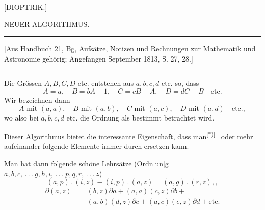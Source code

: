 \clearpage\begingroup
\NoSourceHead{}
\makeatletter\tagsleft@true\let\veqno\@@leqno\makeatother
\begin{center}
{\Large [DIOPTRIK.]}\par\bigskip
{\large{}}\par\bigskip
[I.]\par\medskip
NEUER ALGORITHMUS.\par\medskip
\rule{\linewidth}{.4pt}\par
{\small [Aus Handbuch 21, Bg, Aufsätze, Notizen und Rechnungen zur Mathematik und Astronomie gehörig; Angefangen September 1813, S. 27, 28.]}\par
\rule{\linewidth}{.4pt}
\end{center}
\noindent\hspace*{\parindent}Die Grössen $A, B, C, D$ etc. entstehen aus $a, b, c, d$ etc. so, dass
\[
A=a,\quad B=bA-1,\quad C=cB-A,\quad D=dC-B\quad\text{etc.}
\]
\noindent Wir bezeichnen dann
\[
A\text{ mit }(a,a),\quad B\text{ mit }(a,b),\quad
C\text{ mit }(a,c),\quad D\text{ mit }(a,d)\quad\text{etc.},
\]
\noindent wo also bei $a, b, c, d$ etc. die Ordnung als bestimmt betrachtet wird.

Dieser Algorithmus bietet die interessante Eigenschaft, dass man\textsuperscript{[*)]}\begingroup\renewcommand{\thefootnote}{}\endgroup\  oder mehr aufeinander folgende Elemente immer durch  ersetzen kann.

Man hat dann folgende schöne Lehrsätze (Ordn[un]g $a,b,c,\, .\, .\, .\ g,h,i,\, .\, .\, .\ p,q,r,\, .\, .\, .\ z$)
\begin{equation}
(a,p)\mathbin{.}(i,z)-(i,p)\mathbin{.}(a,z)=(a,g)\mathbin{.}(r,z),,
\tag*{I.}
\end{equation}
\begin{equation}
\begin{aligned}
\partial(a,z)={}&(b,z)\partial a+(a,a)(c,z)\partial b\mathbin{+}{}\\
& (a,b)(d,z)\partial c+(a,c)(e,z)\partial d+\text{etc.}
\end{aligned}
\tag*{II.}
\end{equation}

